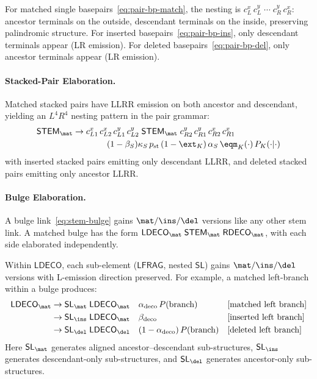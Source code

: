 For matched single basepairs~\eqref{eq:pair-bp-match}, the nesting
is $c_L^x\, c_L^y\;\cdots\;c_R^y\, c_R^x$: ancestor terminals
on the outside, descendant terminals on the inside,
preserving palindromic structure.
For inserted basepairs~\eqref{eq:pair-bp-ins}, only descendant
terminals appear (LR emission).
For deleted basepairs~\eqref{eq:pair-bp-del}, only ancestor
terminals appear (LR emission).

\paragraph{Stacked-Pair Elaboration.}

Matched stacked pairs have LLRR emission on both ancestor
and descendant, yielding an $L^4R^4$ nesting pattern
in the pair grammar:
\begin{align}
\mathsf{STEM}_\mat &\to
  c_{L1}^x\, c_{L2}^x\, c_{L1}^y\, c_{L2}^y\;
  \mathsf{STEM}_\mat\;
  c_{R2}^y\, c_{R1}^y\, c_{R2}^x\, c_{R1}^x
  \notag \\
  &\qquad\qquad
  (1-\beta_S) \kappa_S\, p_{\mathrm{st}}\, (1-\ext_K)\, \alpha_S\,
  \eqm_K(\cdot)\, P_K(\cdot|\cdot)
  \label{eq:pair-stack-match}
\end{align}
with inserted stacked pairs emitting only descendant LLRR,
and deleted stacked pairs emitting only ancestor LLRR.

\paragraph{Bulge Elaboration.}

A bulge link~\eqref{eq:stem-bulge} gains $\mat/\ins/\del$
versions like any other stem link.
A matched bulge has the form
$\mathsf{LDECO}_\mat\;\mathsf{STEM}_\mat\;\mathsf{RDECO}_\mat$,
with each side elaborated independently.

Within $\mathsf{LDECO}$, each sub-element
($\mathsf{LFRAG}$, nested $\mathsf{SL}$) gains $\mat/\ins/\del$
versions with L-emission direction preserved.
For example, a matched left-branch within a bulge produces:
\begin{align}
\mathsf{LDECO}_\mat &\to \mathsf{SL}_\mat\;\mathsf{LDECO}_\mat
  && \alpha_{\mathrm{deco}}\, P(\text{branch})
  && \text{[matched left branch]}
  \label{eq:pair-ldeco-match} \\
&\to \mathsf{SL}_\ins\;\mathsf{LDECO}_\mat
  && \beta_{\mathrm{deco}}
  && \text{[inserted left branch]}
  \label{eq:pair-ldeco-ins} \\
&\to \mathsf{SL}_\del\;\mathsf{LDECO}_\del
  && (1-\alpha_{\mathrm{deco}})\, P(\text{branch})
  && \text{[deleted left branch]}
  \label{eq:pair-ldeco-del}
\end{align}
Here $\mathsf{SL}_\mat$ generates aligned ancestor--descendant
sub-structures, $\mathsf{SL}_\ins$ generates descendant-only
sub-structures, and $\mathsf{SL}_\del$ generates ancestor-only
sub-structures.

